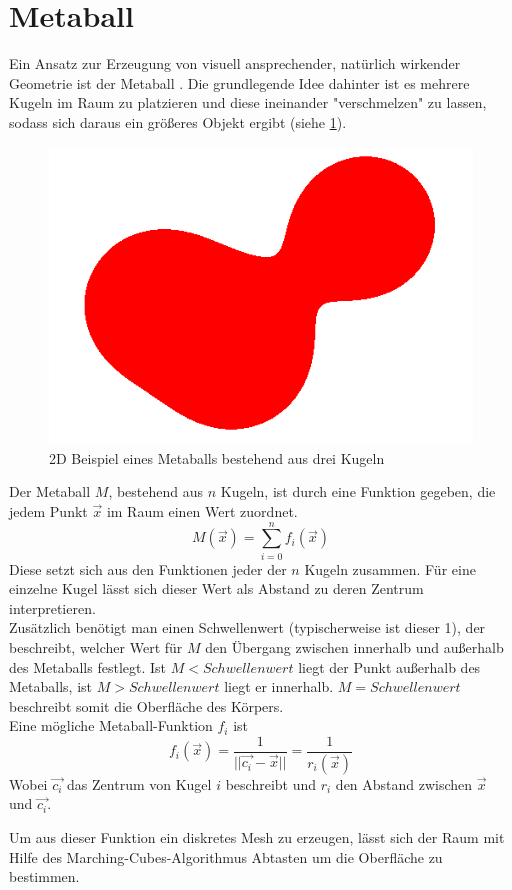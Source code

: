 \section{Metaball} \label{sec:metaball}
Ein Ansatz zur Erzeugung von visuell ansprechender, natürlich wirkender Geometrie ist der Metaball \cite{metaballArticle}.
Die grundlegende Idee dahinter ist es mehrere Kugeln im Raum zu platzieren und diese ineinander "verschmelzen" zu lassen, sodass sich daraus ein größeres Objekt ergibt (siehe \ref{fig:2dMetaball}).

\begin{figure}[ht]
    \centering
    \includegraphics[width=0.5\linewidth]{chapters/02_Grundlagen/Metaball/metaball_2d}
    \caption{2D Beispiel eines Metaballs bestehend aus drei Kugeln}\label{fig:2dMetaball}
\end{figure}

Der Metaball $M$, bestehend aus $n$ Kugeln, ist durch eine Funktion gegeben, die jedem Punkt $\vec{x}$ im Raum einen Wert zuordnet.
\[M(\vec{x})=\sum_{i=0}^{n}f_i(\vec{x})\]
Diese setzt sich aus den Funktionen jeder der $n$ Kugeln zusammen. Für eine einzelne Kugel lässt sich dieser Wert als Abstand zu deren Zentrum interpretieren. \\
Zusätzlich benötigt man einen Schwellenwert (typischerweise ist dieser 1), der beschreibt, welcher Wert für $M$ den Übergang zwischen innerhalb und außerhalb des Metaballs festlegt.
Ist $M<Schwellenwert$ liegt der Punkt außerhalb des Metaballs, ist $M>Schwellenwert$ liegt er innerhalb. $M=Schwellenwert$ beschreibt somit die Oberfläche des Körpers.\\

Eine mögliche Metaball-Funktion $f_i$ ist
\[f_i(\vec{x}) = \frac{1}{||\vec{c_i}-\vec{x}||} = \frac{1}{r_i(\vec{x})}\]
Wobei $\vec{c_i}$ das Zentrum von Kugel $i$ beschreibt und $r_i$ den Abstand zwischen $\vec{x}$ und $\vec{c_i}$.

Um aus dieser Funktion ein diskretes Mesh zu erzeugen, lässt sich der Raum mit Hilfe des Marching-Cubes-Algorithmus Abtasten \cite{marching_cubes} um die Oberfläche zu bestimmen.